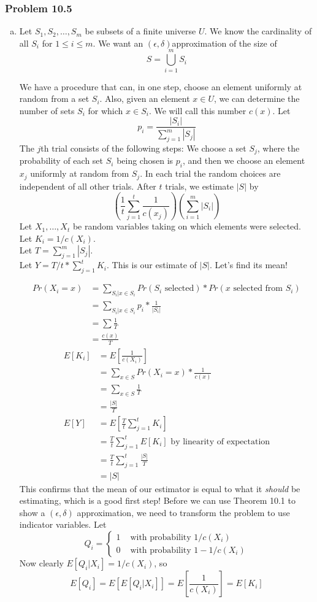 \documentclass[12pt,letterpaper]{article}
\newenvironment{answer}[1]{
  \subsubsection*{Problem #1}
}{\newpage}
\begin{document}
\begin{answer}{10.5}
\begin{enumerate}[(a)]
\item Let $S_1,S_2,\ldots, S_m$ be subsets of a finite universe $U$. We know the cardinality of all $S_i$ for $1 \le i \le m$. We want an $(\epsilon, \delta)$approximation of the size of
	$$ S = \bigcup_{i=1}^m S_i $$

We have a procedure that can, in one step, choose an element uniformly at random from a set $S_i$. Also, given an element $x \in U$, we can determine the number of sets $S_i$ for which $x \in S_i$. We will call this number $c(x)$. Let
	$$p_i = \frac{|S_i|}{\sum_{j=1}^m |S_j|}$$
The $j$th trial consists of the following steps: We choose a set $S_j$, where the probability of each set $S_i$ being chosen is $p_i$, and then we choose an element $x_j$ uniformly at random from $S_j$. In each trial the random choices are independent of all other trials. After $t$ trials, we estimate $|S|$ by
	$$ \left(\frac{1}{t}\sum_{j=1}^t \frac{1}{c(x_j)}\right)\left(\sum_{i=1}^m |S_i|\right) $$
Let $X_1, \ldots, X_t$ be random variables taking on which elements were selected. \\
Let $K_i = 1/ c(X_i)$.\\
Let $T = \sum_{j=1}^m |S_j|$.\\
Let $Y = T/t * \sum_{j=1}^t K_i$. This is our estimate of $|S|$. Let's find its mean!

	\begin{align*}
		Pr(X_i = x) &= \sum_{S_i | x \in S_i} Pr(\text{$S_i$ selected}) * Pr(x \text{ selected from $S_i$}) \\
			&= \sum_{S_i | x \in S_i} p_i * \frac{1}{|S_i|} \\
			&= \sum \frac{1}{T} \\
			&= \frac{c(x)}{T}
	\end{align*}
	\begin{align*}
		E[K_i] &= E\left[   \frac{1}{c(X_i)}  \right] \\
			&= \sum_{x \in S} Pr(X_i = x) * \frac{1}{c(x)} \\
			&= \sum_{x \in S} \frac{1}{T} \\
			&= \frac{|S|}{T} \\
		E[Y] &= E\left[  \frac{T}{t} \sum_{j=1}^t K_i  \right] \\
			&= \frac{T}{t} \sum_{j=1}^t E[K_i] \text{ by linearity of expectation} \\
			&= \frac{T}{t} \sum_{j=1}^t \frac{|S|}{T} \\
			&= |S|
	\end{align*}
	This confirms that the mean of our estimator is equal to what it \emph{should} be estimating, which is a good first step! Before we can use Theorem 10.1 to show a $(\epsilon, \delta)$ approximation, we need to transform the problem to use indicator variables. Let
		$$ Q_i = \begin{cases}
			1 &\mbox{ with probability } 1/c(X_i)\\
			0 &\mbox{ with probability } 1 - 1/c(X_i)
		\end{cases}
		$$
	Now clearly $E[Q_i | X_i] = 1/c(X_i)$, so
		$$E[Q_i] = E[E[Q_i | X_i]] = E\left[\frac{1}{c(X_i)}\right] = E[K_i]$$


\end{enumerate}
\end{answer}
\end{document}
